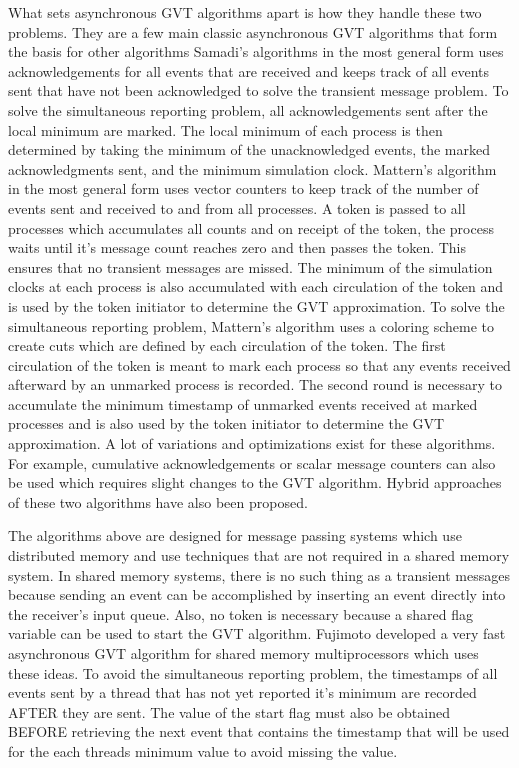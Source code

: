 \documentclass[11pt]{book}
\begin{document}
What sets asynchronous GVT algorithms apart is how they handle these two problems. They are a few
main classic asynchronous GVT algorithms that form the basis for other algorithms
Samadi’s\cite{samadi-85} algorithms in the most general form uses acknowledgements for all events
that are received and keeps track of all events sent that have not been acknowledged to solve the
transient message problem. To solve the simultaneous reporting problem, all acknowledgements sent
after the local minimum are marked. The local minimum of each process is then determined by taking
the minimum of the unacknowledged events, the marked acknowledgments sent, and the minimum
simulation clock. Mattern’s algorithm in the most general form uses vector counters to keep track
of the number of events sent and received to and from all processes. A token is passed to all
processes which accumulates all counts and on receipt of the token, the process waits until it’s
message count reaches zero and then passes the token. This ensures that no transient messages are
missed. The minimum of the simulation clocks at each process is also accumulated with each circulation
of the token and is used by the token initiator to determine the GVT approximation. To solve the
simultaneous reporting problem, Mattern’s algorithm uses a coloring scheme to create cuts which
are defined by each circulation of the token. The first circulation of the token is meant to mark
each process so that any events received afterward by an unmarked process is recorded. The second
round is necessary to accumulate the minimum timestamp of unmarked events received at marked
processes and is also used by the token initiator to determine the GVT approximation. A lot of
variations and optimizations exist for these algorithms. For example, cumulative acknowledgements
or scalar message counters can also be used which requires slight changes to the GVT algorithm.
Hybrid approaches of these two algorithms have also been proposed.

The algorithms above are designed for message passing systems which use distributed memory and use
techniques that are not required in a shared memory system. In shared memory systems, there is no
such thing as a transient messages because sending an event can be accomplished by inserting an
event directly into the receiver's input queue. Also, no token is necessary because a shared flag
variable can be used to start the GVT algorithm. Fujimoto developed a very fast asynchronous GVT
algorithm for shared memory multiprocessors which uses these ideas\cite{fujimoto-94}. To avoid the
simultaneous reporting problem, the timestamps of all events sent by a thread that has not yet
reported it's minimum are recorded AFTER they are sent. The value of the start flag must also be
obtained BEFORE retrieving the next event that contains the timestamp that will be used for the each
threads minimum value to avoid missing the value.
\end{document}

